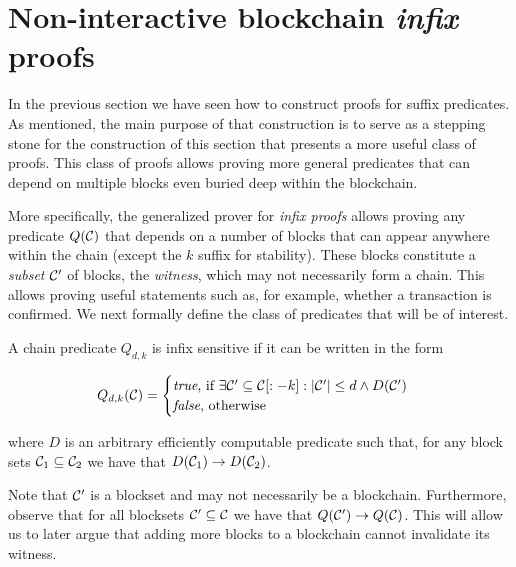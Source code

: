 \section{Non-interactive blockchain \emph{infix} proofs}
\label{sec:infix}

In the previous section we have seen how to construct proofs for suffix
predicates. As mentioned, the main purpose of that construction is to serve as a
stepping stone for the construction of this section that presents a more useful
class of proofs. This class of proofs allows proving more general predicates
that can depend on multiple blocks even buried deep within the blockchain.

More specifically, the generalized prover for \emph{infix proofs} allows
proving any predicate $Q(\mathcal{C})$ that depends on a number of blocks that can
appear anywhere within the chain (except the $k$ suffix for stability). These
blocks constitute a \emph{subset} $\mathcal{C}'$ of blocks, the \emph{witness},
which may not necessarily form a chain. This allows proving useful statements
such as, for example, whether a transaction is confirmed. We next formally
define the class of predicates that will be of interest.

\begin{definition}
\label{def:infix}
A chain predicate $Q_{d,k}$ is \textnormal{infix sensitive} if it can be
written in the form

$$
Q_{d,k}(\mathcal{C}) =
\begin{cases}
  \text{\emph{true}, if }
    \exists \mathcal{C}' \subseteq \mathcal{C}[:-k]: |\mathcal{C}'| \leq d \land D(\mathcal{C}')\\
  \text{\emph{false}, otherwise}
\end{cases}
$$

where $D$ is an arbitrary efficiently computable predicate such that, for any
block sets $\mathcal{C}_1 \subseteq \mathcal{C}_2$ we have that
$D(\mathcal{C}_1) \rightarrow D(\mathcal{C}_2)$.
\end{definition}

Note that $\mathcal{C}'$ is a blockset and may not necessarily be a blockchain.
Furthermore, observe that for all blocksets $\mathcal{C}' \subseteq \mathcal{C}$ we have
that $Q(\mathcal{C}') \rightarrow Q(\mathcal{C})$. This will allow us to later argue that
adding more blocks to a blockchain cannot invalidate its witness.

